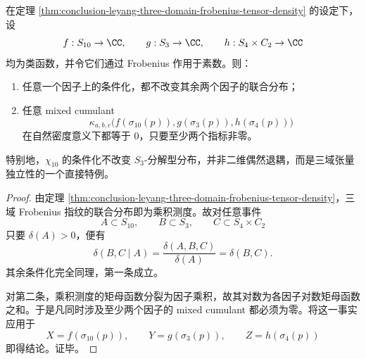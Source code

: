 \begin{corollary}\label{cor:conclusion-leyang-three-domain-conditional-invariance-cumulant-vanish}
在定理 \ref{thm:conclusion-leyang-three-domain-frobenius-tensor-density} 的设定下，设
\[
f:S_{10}\to\CC,\qquad
g:S_3\to\CC,\qquad
h:S_4\times C_2\to\CC
\]
均为类函数，并令它们通过 Frobenius 作用于素数。则：
\begin{enumerate}
  \item 任意一个因子上的条件化，都不改变其余两个因子的联合分布；
  \item 任意 mixed cumulant
  \[
  \kappa_{a,b,c}\bigl(f(\sigma_{10}(p)),g(\sigma_3(p)),h(\sigma_4(p))\bigr)
  \]
  在自然密度意义下都等于 \(0\)，只要至少两个指标非零。
\end{enumerate}
特别地，\(\chi_{10}\) 的条件化不改变 \(S_3\)-分解型分布，并非二维偶然退耦，而是三域张量独立性的一个直接特例。
\end{corollary}
\begin{proof}
由定理 \ref{thm:conclusion-leyang-three-domain-frobenius-tensor-density}，三域 Frobenius 指纹的联合分布即为乘积测度。故对任意事件
\[
A\subset S_{10},\qquad B\subset S_3,\qquad C\subset S_4\times C_2
\]
只要 \(\delta(A)>0\)，便有
\[
\delta(B,C\mid A)
=
\frac{\delta(A,B,C)}{\delta(A)}
=
\delta(B,C).
\]
其余条件化完全同理，第一条成立。

对第二条，乘积测度的矩母函数分裂为因子乘积，故其对数为各因子对数矩母函数之和。于是凡同时涉及至少两个因子的 mixed cumulant 都必须为零。将这一事实应用于
\[
X=f(\sigma_{10}(p)),\qquad
Y=g(\sigma_3(p)),\qquad
Z=h(\sigma_4(p))
\]
即得结论。证毕。
\end{proof}

